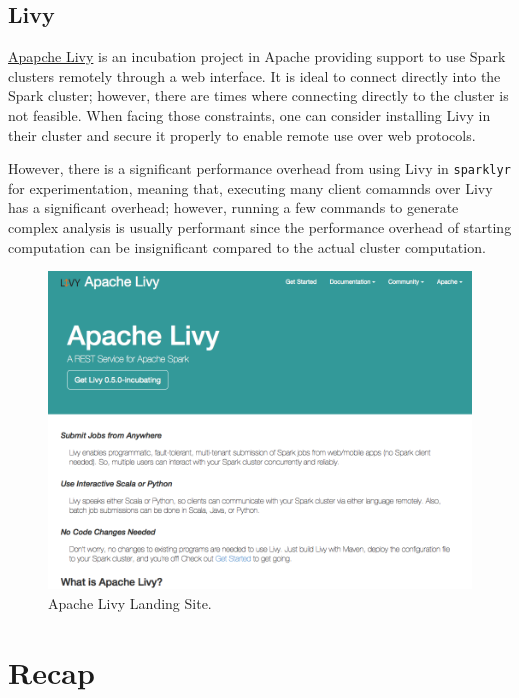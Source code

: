 \documentclass[]{book}
\theoremstyle{definition}
\theoremstyle{definition}
\theoremstyle{definition}
\theoremstyle{remark}
\begin{document}
\hypertarget{clusters-livy}{%
\subsection{Livy}\label{clusters-livy}}

\href{https://livy.incubator.apache.org/}{Apapche Livy} is an incubation
project in Apache providing support to use Spark clusters remotely
through a web interface. It is ideal to connect directly into the Spark
cluster; however, there are times where connecting directly to the
cluster is not feasible. When facing those constraints, one can consider
installing Livy in their cluster and secure it properly to enable remote
use over web protocols.

However, there is a significant performance overhead from using Livy in
\texttt{sparklyr} for experimentation, meaning that, executing many
client comamnds over Livy has a significant overhead; however, running a
few commands to generate complex analysis is usually performant since
the performance overhead of starting computation can be insignificant
compared to the actual cluster computation.

\begin{figure}

{\centering \includegraphics[width=13.78in]{images/05-clusters-apache-livy} 

}

\caption{Apache Livy Landing Site.}\label{fig:apache-livy}
\end{figure}

\hypertarget{recap-1}{%
\section{Recap}\label{recap-1}}
\end{document}
